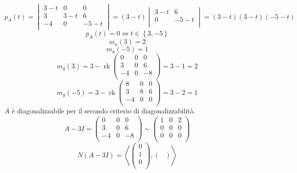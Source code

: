 \documentclass[a4paper,12pt]{article}
\renewcommand{\(}{\left(}
\renewcommand{\)}{\right)}
\renewcommand{\sp}[1]{\left< #1 \right>}
\DeclareMathOperator{\rk}{rk}
\newenvironment{solution}
{\par\noindent{\bf\large Soluzione}\vspace{1em}\hfill\break}
{\hfill}
\begin{document}
\begin{solution}
  $$
    p_A\left( t \right)=
    \begin{vmatrix}
      3-t & 0   & 0    \\
      3   & 3-t & 6    \\
      -4  & 0   & -5-t \\
    \end{vmatrix}
    =
    \left( 3-t \right)
    \begin{vmatrix}
      3-t & 6    \\
      0   & -5-t \\
    \end{vmatrix}
    =
    \left( 3-t \right)\left( 3-t \right)\left( -5-t \right)
  $$
  $$p_A\left( t \right)=0\iff t\in\left\{ 3,-5 \right\}$$
  $$m_a\left( 3 \right)=2$$
  $$m_a\left( -5 \right)=1$$
  $$
    m_g\left( 3 \right)=3-\rk
    \begin{pmatrix}
      0  & 0 & 0  \\
      3  & 0 & 6  \\
      -4 & 0 & -8 \\
    \end{pmatrix}
    =3-1=2
  $$
  $$
    m_g\left( -5 \right)=3-\rk
    \begin{pmatrix}
      8  & 0 & 0 \\
      3  & 8 & 6 \\
      -4 & 0 & 0 \\
    \end{pmatrix}
    =3-2=1
  $$
  $A$ è diagonalizzabile per il secondo criterio di diagonalizzabilità.
  $$
    A-3I=
    \begin{pmatrix}
      0  & 0 & 0  \\
      3  & 0 & 6  \\
      -4 & 0 & -8 \\
    \end{pmatrix}
    \sim
    \begin{pmatrix}
      1 & 0 & 2 \\
      0 & 0 & 0 \\
      0 & 0 & 0 \\
    \end{pmatrix}
  $$
  $$
    N\left( A-3I \right)=\sp{
      \begin{pmatrix}
        0 \\
        1 \\
        0 \\
      \end{pmatrix}
      ,
      \begin{pmatrix}

\end{pmatrix}}$$
\end{solution}
\end{document}
